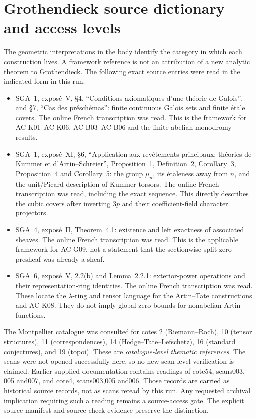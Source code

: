 \documentclass[11pt,a4paper]{article}
\theoremstyle{definition}
\theoremstyle{remark}
\begin{document}
\section{Grothendieck source dictionary and access levels}
\label{sec:groth-source}
The geometric interpretations in the body identify the
category in which each construction lives. A framework
reference is not an attribution of a new analytic theorem
to Grothendieck. The following exact source entries were
read in the indicated form in this run.
\begin{itemize}
\item SGA~1, expos\'e~V, \S4, ``Conditions axiomatiques
d'une th\'eorie de Galois'', and \S7, ``Cas des
pr\'esch\'emas'': finite continuous Galois sets and
finite \'etale covers. The online French transcription
was read. This is the framework for AC-K01--AC-K06,
AC-B03--AC-B06 and the finite abelian monodromy results.
\item SGA~1, expos\'e~XI, \S6, ``Application aux
rev\^etements principaux: th\'eories de Kummer et
d'Artin--Schreier'', Proposition~1, Definition~2,
Corollary~3, Proposition~4 and Corollary~5: the group
$\mu_n$, its \'etaleness away from $n$, and the
unit/Picard description of Kummer torsors. The online
French transcription was read, including the exact
sequence. This directly describes the cubic covers
after inverting $3p$ and their coefficient-field
character projectors.
\item SGA~4, expos\'e~II, Theorem~4.1: existence and
left exactness of associated sheaves. The online
French transcription was read. This is the applicable
framework for AC-G09, not a statement that the
sectionwise split-zero presheaf was already a sheaf.
\item SGA~6, expos\'e~V, 2.2(b) and Lemma~2.2.1:
exterior-power operations and their representation-ring
identities. The online French transcription was read.
These locate the $\lambda$-ring and tensor language
for the Artin--Tate constructions and AC-K08. They
do not imply global zero bounds for nonabelian
Artin functions.
\end{itemize}

The Montpellier catalogue was consulted for cotes 2
(Riemann--Roch), 10 (tensor structures), 11
(correspondences), 14 (Hodge--Tate--Lefschetz), 16
(standard conjectures), and 19 (topoi). These are
\emph{catalogue-level thematic references}. The scans
were not opened successfully here, so no new
scan-level verification is claimed. Earlier supplied
documentation contains readings of cote54, scans003,
005 and007, and cote4, scans003,005 and006. Those
records are carried as historical source records,
not as scans reread by this run. Any requested
archival implication requiring such a reading
remains a source-access gate. The explicit source
manifest and source-check evidence preserve the
distinction.
\end{document}
